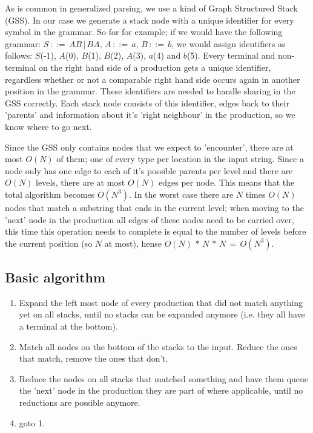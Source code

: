 \documentclass[a4paper,10pt]{article}
\begin{document}
As is common in generalized parsing, we use a kind of Graph Structured Stack (GSS). In our case we generate a stack node with a unique identifier for every symbol in the grammar. So for for example; if we would have the following grammar: $S\,::=\,AB\,|\,BA,\,A\,::=\,a,\,B\,::=\,b$, we would assign identifiers as follows: $S$(-1), $A$(0), $B$(1), $B$(2), $A$(3), $a$(4) and $b$(5). Every terminal and non-terminal on the right hand side of a production gets a unique identifier, regardless whether or not a comparable right hand side occurs again in another position in the grammar. These identifiers are needed to handle sharing in the GSS correctly. Each stack node consists of this identifier, edges back to their 'parents' and information about it's 'right neighbour' in the production, so we know where to go next.

Since the GSS only contains nodes that we expect to 'encounter', there are at most $O(N)$ of them; one of every type per location in the input string. Since a node only has one edge to each of it's possible parents per level and there are $O(N)$ levels, there are at most $O(N)$ edges per node. This means that the total algorithm becomes $O(N^3)$. In the worst case there are $N$ times $O(N)$ nodes that match a substring that ends in the current level; when moving to the 'next' node in the production all edges of these nodes need to be carried over, this time this operation needs to complete is equal to the number of levels before the current position (so $N$ at most), hense $O(N)\,*\,N\,*\,N\,=\,O(N^3)$.

\subsection{Basic algorithm}

\begin{enumerate}
 \setlength{\itemsep}{0pt}
 \setlength{\parskip}{0pt}
 \setlength{\parsep}{0pt}

 \item Expand the left most node of every production that did not match anything yet on all stacks, until no stacks can be expanded anymore (i.e. they all have a terminal at the bottom).
 \item Match all nodes on the bottom of the stacks to the input. Reduce the ones that match, remove the ones that don't.
 \item Reduce the nodes on all stacks that matched something and have them queue the 'next' node in the production they are part of where applicable, until no reductions are possible anymore.
 \item goto 1.
\end{enumerate}
\end{document}
